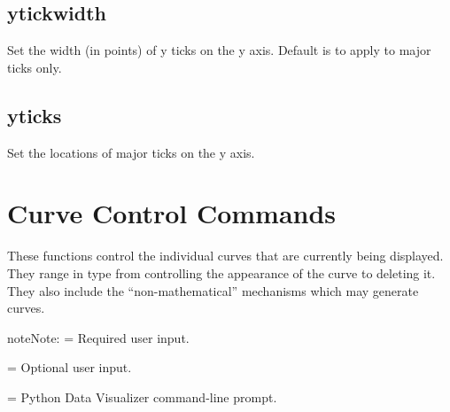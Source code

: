 \documentclass[letterpaper,10pt,english]{sphinxmanual}
\begin{document}
\subsection{ytickwidth}
\label{\detokenize{plot_control_cmds:ytickwidth}}
Set the width (in points) of y ticks on the y axis. Default is to apply to major ticks only.

\begin{sphinxVerbatim}[commandchars=\\\{\}]
\PYG{p}{[}\PYG{p}{]}   \PYG{p}{[}     \PYG{p}{]}
\end{sphinxVerbatim}


\subsection{yticks}
\label{\detokenize{plot_control_cmds:yticks}}
Set the locations of major ticks on the y axis.

\begin{sphinxVerbatim}[commandchars=\\\{\}]
\PYG{p}{[}\PYG{p}{]}               
\end{sphinxVerbatim}


\section{Curve Control Commands}
\label{\detokenize{curve_control_cmds:curve-control-commands}}\label{\detokenize{curve_control_cmds:id1}}\label{\detokenize{curve_control_cmds::doc}}
These functions control the individual curves that are currently being displayed. They range in type from controlling the appearance of the curve to deleting it. They also include the “non-mathematical” mechanisms which may generate curves.

\begin{sphinxadmonition}{note}{Note:}
\sphinxstylestrong{\textless{} \textgreater{}} = Required user input.

\sphinxstylestrong{{[} {]}} = Optional user input.

\sphinxstylestrong{{[}PyDV{]}:} = Python Data Visualizer command-line prompt.
\end{sphinxadmonition}
\end{document}
